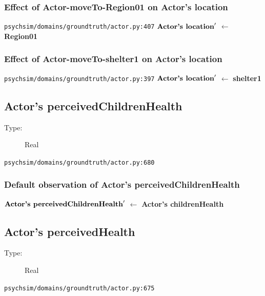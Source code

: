 \documentclass{article}%
\begin{document}
%
\subsubsection{Effect of Actor{-}moveTo{-}Region01 on Actor's location}%
\label{ssubsec:Effect of Actor{-}moveTo{-}Region01 on Actor's location}%
\begin{flushleft}%
\verb|psychsim/domains/groundtruth/actor.py:407|%
\linebreak%
$\mbox{\textbf{Actor's location}} '$%
$\leftarrow$%
\textbf{Region01}%
\end{flushleft}

%
\subsubsection{Effect of Actor{-}moveTo{-}shelter1 on Actor's location}%
\label{ssubsec:Effect of Actor{-}moveTo{-}shelter1 on Actor's location}%
\begin{flushleft}%
\verb|psychsim/domains/groundtruth/actor.py:397|%
\linebreak%
$\mbox{\textbf{Actor's location}} '$%
$\leftarrow$%
\textbf{shelter1}%
\end{flushleft}

%
\subsection{Actor's perceivedChildrenHealth}%
\label{subsec:Actor's perceivedChildrenHealth}%
\begin{description}%
\item[Type:]%
Real%
\end{description}%
\begin{flushleft}%
\verb|psychsim/domains/groundtruth/actor.py:680|%
\end{flushleft}%
\subsubsection{Default observation of Actor's perceivedChildrenHealth}%
\label{ssubsec:Default observation of Actor's perceivedChildrenHealth}%
\begin{flushleft}%
$\mbox{\textbf{Actor's perceivedChildrenHealth}} '$%
$\leftarrow$%
\textbf{Actor's childrenHealth}%
\end{flushleft}

%
\subsection{Actor's perceivedHealth}%
\label{subsec:Actor's perceivedHealth}%
\begin{description}%
\item[Type:]%
Real%
\end{description}%
\begin{flushleft}%
\verb|psychsim/domains/groundtruth/actor.py:675|%
\end{flushleft}%
\end{document}
